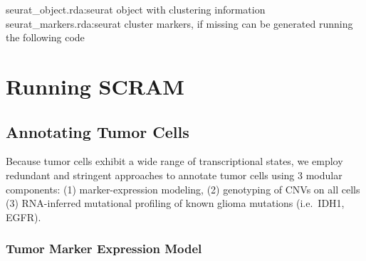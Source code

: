 \documentclass[]{article}
\newcommand{\hlnum}[1]{\textcolor[rgb]{0.816,0.125,0.439}{#1}}%
\newcommand{\hlstr}[1]{\textcolor[rgb]{0.251,0.627,0.251}{#1}}%
\newcommand{\hlstd}[1]{\textcolor[rgb]{0.251,0.251,0.251}{#1}}%
\newcommand{\hlkwd}[1]{\textcolor[rgb]{0.878,0.439,0.125}{#1}}%
\newenvironment{Shaded}{\begin{myshaded}}{\end{myshaded}}
\newcommand{\FloatTok}[1]{\hlnum{#1}}
\newcommand{\SpecialCharTok}[1]{\hlstr{#1}}
\newcommand{\StringTok}[1]{\hlstr{#1}}
\newcommand{\OtherTok}[1]{{#1}}
\newcommand{\FunctionTok}[1]{\hlstd{#1}}
\newcommand{\ControlFlowTok}[1]{\hlkwd{#1}}
\newcommand{\AttributeTok}[1]{{#1}}
\newcommand{\NormalTok}[1]{\hlstd{#1}}
\begin{document}
seurat\_object.rda:seurat object with clustering information
seurat\_markers.rda:seurat cluster markers, if missing can be generated running the following code

\begin{Shaded}
\end{Shaded}

\hypertarget{running-scram}{%
\section{Running SCRAM}\label{running-scram}}

\hypertarget{annotating-tumor-cells}{%
\subsection{Annotating Tumor Cells}\label{annotating-tumor-cells}}

Because tumor cells exhibit a wide range of transcriptional states, we employ redundant and stringent approaches to annotate tumor cells using 3 modular components: (1) marker-expression modeling, (2) genotyping of CNVs on all cells (3) RNA-inferred mutational profiling of known glioma mutations (i.e.~IDH1, EGFR).

\hypertarget{tumor-marker-expression-model}{%
\subsubsection{Tumor Marker Expression Model}\label{tumor-marker-expression-model}}
\end{document}
